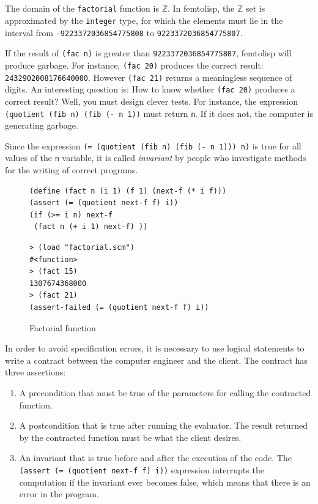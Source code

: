 \documentclass[a4paper,12pt]{book}
\newenvironment{fmpage}[1]
           {\begin{lrbox}{\fmbox}\begin{minipage}{#1}}
           {\end{minipage}\end{lrbox}\fbox{\usebox{\fmbox}}}
\begin{document}
\verb||\\
\verb||\\
The domain of the \verb|factorial| function is $\mathbb{Z}$.
In femtolisp, the $\mathbb{Z}$ set is approximated
by the \verb|integer| type, for which the elements
must lie in the interval from \verb|-9223372036854775808|
to \verb|9223372036854775807|.

If the result of \verb|(fac n)| is greater
than  \verb|9223372036854775807|,
femtolisp will produce garbage.
For instance, \verb|(fac 20)| produces the
correct result: \verb|2432902008176640000|.
However \verb|(fac 21)| returns a meaningless
sequence of digits.
An interesting question is: How to know
whether \verb|(fac 20)| produces a correct
result? Well, you must design clever tests.
For instance, the expression
\verb|(quotient (fib n) (fib (- n 1))|
must return \verb|n|. If it does not,
the computer is generating garbage.

Since the
expression \verb|(= (quotient (fib n) (fib (- n 1))) n)|
is true for all values of the \verb|n| variable,
it is called {\em invariant} by people
who investigate methods for the writing of correct
programs.

\begin{figure}[!h]
\begin{fmpage}{0.8\linewidth}
\begin{verbatim}
(define (fact n (i 1) (f 1) (next-f (* i f)))
(assert (= (quotient next-f f) i))
(if (>= i n) next-f
 (fact n (+ i 1) next-f) ))
\end{verbatim}
\end{fmpage}

\begin{fmpage}{0.8\linewidth}
\begin{verbatim}
> (load "factorial.scm")
#<function>
> (fact 15)
1307674368000
> (fact 21)
(assert-failed (= (quotient next-f f) i))
\end{verbatim}
\end{fmpage}
\caption{Factorial function}
\label{loop-invariant/fact}
\end{figure}

In order to avoid specification errors,
it is necessary to use logical statements
to write a contract between the computer
engineer and the client. The contract has
three assertions:
\begin{enumerate}
\item A precondition that must be true
of the parameters for calling the contracted function.
\item A postcondition that is true after running
the evaluator. The result returned by the
contracted function must be what the client desires.
\item An invariant that is
true before and after the execution of the code.  
The \verb|(assert (= (quotient next-f f) i))|
expression interrupts the computation if
the invariant ever becomes false, which
means that there is an error in the program.
\end{enumerate}
\end{document}
